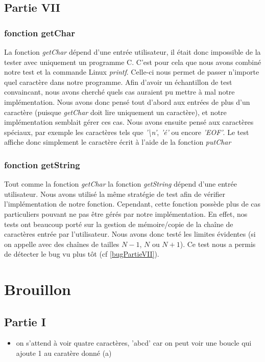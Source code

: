 \documentclass{article}
\begin{document}
    \subsection{Partie VII}
    \subsubsection{fonction getChar}
    La fonction \textit{getChar} dépend d'une entrée utilisateur, il était donc
    impossible de la tester avec uniquement un programme C. C'est pour cela que
    nous avons combiné notre test et la commande Linux \textit{printf}. Celle-ci
    nous permet de passer n'importe quel caractère dans notre programme. Afin
    d'avoir un échantillon de test convaincant, nous avons cherché quels cas
    auraient pu mettre à mal notre implémentation. Nous avons donc pensé tout
    d'abord aux entrées de plus d'un caractère (puisque \textit{getChar} doit lire
    uniquement un caractère), et notre implémentation semblait gérer ces cas. Nous
    avons ensuite pensé aux caractères spéciaux, par exemple les caractères tels
    que \textit{'\textbackslash n'}, \textit{'é'} ou encore \textit{'EOF'}. Le test
    affiche donc simplement le caractère écrit à l'aide de la fonction
    \textit{putChar}
    \subsubsection{fonction getString}
    Tout comme la fonction \textit{getChar} la fonction \textit{getString} dépend
    d'une entrée utilisateur. Nous avons utilisé la même stratégie de test afin de
    vérifier l'implémentation de notre fonction. Cependant, cette fonction possède
    plus de cas particuliers pouvant ne pas être gérés par notre implémentation. En
    effet, nos tests ont beaucoup porté sur la gestion de mémoire/copie de la
    chaîne de caractères entrée par l'utilisateur. Nous avons donc testé les
    limites évidentes (si on appelle avec des chaînes de tailles $N-1$, $N$ ou
    $N+1$). Ce test nous a permis de détecter le bug vu plus tôt (cf
    \ref{bugPartieVII}).
\section{Brouillon}
\subsection{Partie I}
\begin{itemize}
	\item on s'attend à voir quatre caractères, 'abcd' car on peut voir une boucle qui
	      ajoute 1 au caratère donné (a)

\end{itemize}
\end{document}
